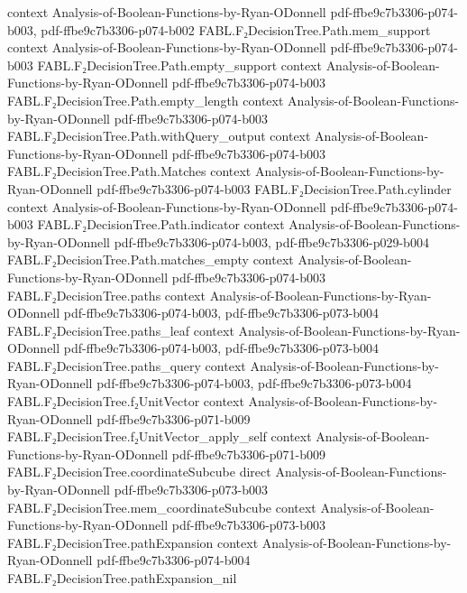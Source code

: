 \begin{theorem}
  {context}
  {Analysis-of-Boolean-Functions-by-Ryan-ODonnell}
  {pdf-ffbe9c7b3306-p074-b003,
    pdf-ffbe9c7b3306-p074-b002}
\proofstep
  {FABL.F₂DecisionTree.Path.mem_support}
  {context}
  {Analysis-of-Boolean-Functions-by-Ryan-ODonnell}
  {pdf-ffbe9c7b3306-p074-b003}
\proofstep
  {FABL.F₂DecisionTree.Path.empty_support}
  {context}
  {Analysis-of-Boolean-Functions-by-Ryan-ODonnell}
  {pdf-ffbe9c7b3306-p074-b003}
\proofstep
  {FABL.F₂DecisionTree.Path.empty_length}
  {context}
  {Analysis-of-Boolean-Functions-by-Ryan-ODonnell}
  {pdf-ffbe9c7b3306-p074-b003}
\proofstep
  {FABL.F₂DecisionTree.Path.withQuery_output}
  {context}
  {Analysis-of-Boolean-Functions-by-Ryan-ODonnell}
  {pdf-ffbe9c7b3306-p074-b003}
\proofstep
  {FABL.F₂DecisionTree.Path.Matches}
  {context}
  {Analysis-of-Boolean-Functions-by-Ryan-ODonnell}
  {pdf-ffbe9c7b3306-p074-b003}
\proofstep
  {FABL.F₂DecisionTree.Path.cylinder}
  {context}
  {Analysis-of-Boolean-Functions-by-Ryan-ODonnell}
  {pdf-ffbe9c7b3306-p074-b003}
\proofstep
  {FABL.F₂DecisionTree.Path.indicator}
  {context}
  {Analysis-of-Boolean-Functions-by-Ryan-ODonnell}
  {pdf-ffbe9c7b3306-p074-b003,
    pdf-ffbe9c7b3306-p029-b004}
\proofstep
  {FABL.F₂DecisionTree.Path.matches_empty}
  {context}
  {Analysis-of-Boolean-Functions-by-Ryan-ODonnell}
  {pdf-ffbe9c7b3306-p074-b003}
\proofstep
  {FABL.F₂DecisionTree.paths}
  {context}
  {Analysis-of-Boolean-Functions-by-Ryan-ODonnell}
  {pdf-ffbe9c7b3306-p074-b003,
    pdf-ffbe9c7b3306-p073-b004}
\proofstep
  {FABL.F₂DecisionTree.paths_leaf}
  {context}
  {Analysis-of-Boolean-Functions-by-Ryan-ODonnell}
  {pdf-ffbe9c7b3306-p074-b003,
    pdf-ffbe9c7b3306-p073-b004}
\proofstep
  {FABL.F₂DecisionTree.paths_query}
  {context}
  {Analysis-of-Boolean-Functions-by-Ryan-ODonnell}
  {pdf-ffbe9c7b3306-p074-b003,
    pdf-ffbe9c7b3306-p073-b004}
\proofstep
  {FABL.F₂DecisionTree.f₂UnitVector}
  {context}
  {Analysis-of-Boolean-Functions-by-Ryan-ODonnell}
  {pdf-ffbe9c7b3306-p071-b009}
\proofstep
  {FABL.F₂DecisionTree.f₂UnitVector_apply_self}
  {context}
  {Analysis-of-Boolean-Functions-by-Ryan-ODonnell}
  {pdf-ffbe9c7b3306-p071-b009}
\proofstep
  {FABL.F₂DecisionTree.coordinateSubcube}
  {direct}
  {Analysis-of-Boolean-Functions-by-Ryan-ODonnell}
  {pdf-ffbe9c7b3306-p073-b003}
\proofstep
  {FABL.F₂DecisionTree.mem_coordinateSubcube}
  {context}
  {Analysis-of-Boolean-Functions-by-Ryan-ODonnell}
  {pdf-ffbe9c7b3306-p073-b003}
\proofstep
  {FABL.F₂DecisionTree.pathExpansion}
  {context}
  {Analysis-of-Boolean-Functions-by-Ryan-ODonnell}
  {pdf-ffbe9c7b3306-p074-b004}
\proofstep
  {FABL.F₂DecisionTree.pathExpansion_nil}

\end{theorem}

